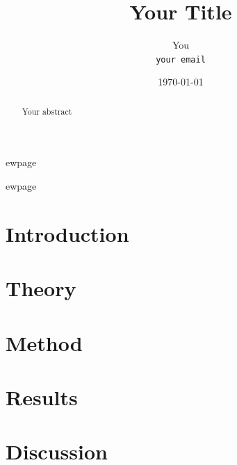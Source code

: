\documentclass[a4paper,11pt]{article}
\title{Your Title}
\author{You\\
\texttt{your email}}
\date{\today}
\begin{document}
\maketitle
\thispagestyle{empty}
\begin{abstract}
Your abstract
\end{abstract}


ewpage
\tableofcontents
\thispagestyle{plain}
\setcounter{page}{1}




ewpage

\section{Introduction}





\section{Theory}





\section{Method}





\section{Results}





\section{Discussion}
\end{document}
